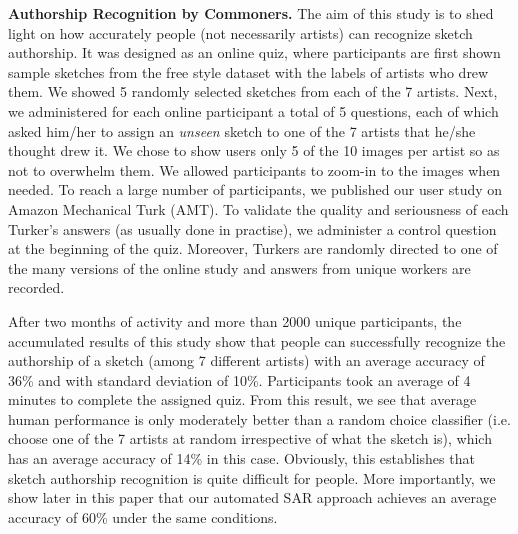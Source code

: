 \noindent\textbf{Authorship Recognition by Commoners.} The aim of this study is to shed light on how accurately people (not necessarily artists) can recognize sketch authorship. It was designed as an online quiz, where participants are first shown sample sketches from the free style dataset with the labels of artists who drew them. We showed 5 randomly selected sketches from each of the 7 artists. Next, we administered for each online participant a total of 5 questions, each of which asked him/her to assign an \emph{unseen} sketch to one of the 7 artists that he/she thought drew it. We chose to show users only 5 of the 10 images per artist so as not to overwhelm them. We allowed participants to zoom-in to the images when needed. To reach a large number of participants, we published our user study on Amazon Mechanical Turk (AMT). To validate the quality and seriousness of each Turker's answers (as usually done in practise), we administer a control question at the beginning of the quiz. Moreover, Turkers are randomly directed to one of the many versions of the online study and answers from unique workers are recorded.

After two months of activity and more than 2000 unique participants, the accumulated results of this study show that people can successfully recognize the authorship of a sketch (among 7 different artists) with an average accuracy of 36\% and with standard deviation of 10\%. Participants took an average of 4 minutes to complete the assigned quiz. From this result, we see that average human performance is only moderately better than a random choice classifier (i.e. choose one of the 7 artists at random irrespective of what the sketch is), which has an average accuracy of 14\% in this case. Obviously, this establishes that sketch authorship recognition is quite difficult for people. More importantly, we show later in this paper that our automated SAR approach achieves an average accuracy of 60\% under the same conditions.



